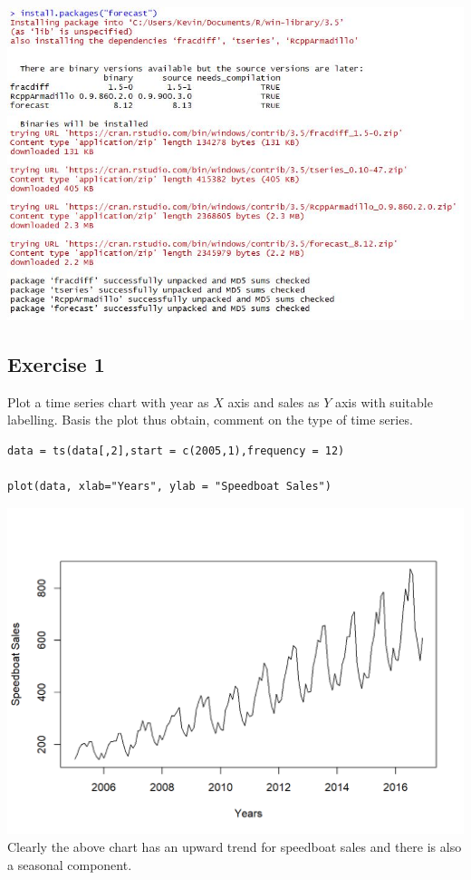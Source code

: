 \documentclass[a4paper,12pt]{article}
\begin{document}
\newpage 

\includegraphics[]{00-B2/images/install_forecast.JPG}

\newpage

\subsection*{Exercise 1}
Plot a time series chart
with year as $X$ axis and sales as $Y$
axis with suitable labelling. Basis the plot thus obtain,
comment on the type of time series.

\begin{framed}
\begin{verbatim}
data = ts(data[,2],start = c(2005,1),frequency = 12)

plot(data, xlab="Years", ylab = "Speedboat Sales")
\end{verbatim}
\end{framed}

\includegraphics[]{00-B2/images/Speedboat_1.png}
\newpage 
\noindent Clearly the above chart has an upward trend for speedboat sales and there is also a seasonal
component.
\end{document}
